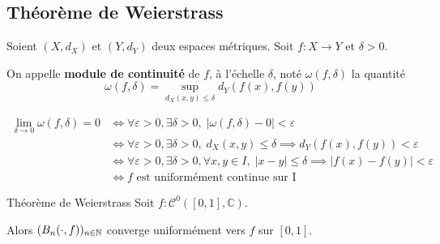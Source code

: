 \documentclass[a4paper, 12pt]{article}
\begin{document}
\subsection{Théorème de Weierstrass}

\begin{definition}
    Soient $(X, d_X)$ et $(Y, d_Y)$ deux espaces métriques. Soit $f: X \to Y$ et $\delta > 0$.

    On appelle \textbf{module de continuité} de $f$, à l'échelle $\delta$, noté $\omega(f, \delta)$ la quantité
    $$
    \omega(f, \delta) = \sup_{d_X(x, y) \leq \delta} d_Y(f(x), f(y))
    $$
\end{definition}

\begin{remarque}
    \begin{align*}
        \lim_{\delta \to 0} \omega(f, \delta) = 0 &\iff \forall \varepsilon > 0, \exists \delta > 0, \; |\omega(f, \delta) - 0| < \varepsilon \\
        &\iff \forall \varepsilon > 0, \exists \delta > 0, \; d_X(x, y) \leq \delta \implies d_Y(f(x), f(y)) < \varepsilon \\
        &\iff \forall \varepsilon > 0, \exists \delta > 0, \forall x, y \in I, \; |x - y| \leq \delta \implies |f(x) - f(y)| < \varepsilon \\
        &\iff f \text{ est uniformément continue sur I}
    \end{align*}
\end{remarque}

\begin{theoreme}{Théorème de Weierstrass}{}
    Soit $f: \mathcal{C}^0([0, 1], \mathbb{C})$.
    
    Alors $(B_n(\cdot, f))_{n \in \mathbb{N}}$ converge uniformément vers $f$ sur $[0, 1]$.
\end{theoreme}
\end{document}
